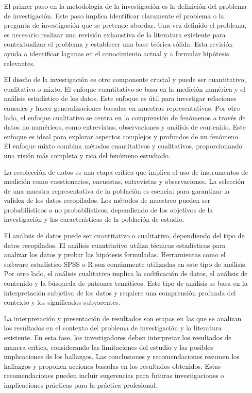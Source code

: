 \documentclass[12pt]{article}
\begin{document}
El primer paso en la metodología de la investigación es la definición del problema de investigación. Este paso implica identificar claramente el problema o la pregunta de investigación que se pretende abordar. Una vez definido el problema, es necesario realizar una revisión exhaustiva de la literatura existente para contextualizar el problema y establecer una base teórica sólida. Esta revisión ayuda a identificar lagunas en el conocimiento actual y a formular hipótesis relevantes.

El diseño de la investigación es otro componente crucial y puede ser cuantitativo, cualitativo o mixto. El enfoque cuantitativo se basa en la medición numérica y el análisis estadístico de los datos. Este enfoque es útil para investigar relaciones causales y hacer generalizaciones basadas en muestras representativas. Por otro lado, el enfoque cualitativo se centra en la comprensión de fenómenos a través de datos no numéricos, como entrevistas, observaciones y análisis de contenido. Este enfoque es ideal para explorar aspectos complejos y profundos de un fenómeno. El enfoque mixto combina métodos cuantitativos y cualitativos, proporcionando una visión más completa y rica del fenómeno estudiado.

La recolección de datos es una etapa crítica que implica el uso de instrumentos de medición como cuestionarios, encuestas, entrevistas y observaciones. La selección de una muestra representativa de la población es esencial para garantizar la validez de los datos recopilados. Los métodos de muestreo pueden ser probabilísticos o no probabilísticos, dependiendo de los objetivos de la investigación y las características de la población de estudio.

El análisis de datos puede ser cuantitativo o cualitativo, dependiendo del tipo de datos recopilados. El análisis cuantitativo utiliza técnicas estadísticas para analizar los datos y probar las hipótesis formuladas. Herramientas como el software estadístico SPSS o R son comúnmente utilizadas en este tipo de análisis. Por otro lado, el análisis cualitativo implica la codificación de datos, el análisis de contenido y la búsqueda de patrones temáticos. Este tipo de análisis se basa en la interpretación subjetiva de los datos y requiere una comprensión profunda del contexto y los significados subyacentes.

La interpretación y presentación de resultados son etapas en las que se analizan los resultados en el contexto del problema de investigación y la literatura existente. En esta fase, los investigadores deben interpretar los resultados de manera crítica, considerando las limitaciones del estudio y las posibles implicaciones de los hallazgos. Las conclusiones y recomendaciones resumen los hallazgos y proponen acciones basadas en los resultados obtenidos. Estas recomendaciones pueden incluir sugerencias para futuras investigaciones o implicaciones prácticas para la práctica profesional.
\end{document}
